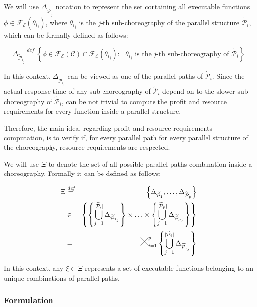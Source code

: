 \documentclass[12pt,a4paper]{report}
\newcommand{\Cross}{\mathbin{\tikz [x=2.5ex,y=2.5ex,line width=.10ex] \draw (0,0) -- (1,1) (0,1) -- (1,0);}}
\newcommand{\mathDef}{\overset{\textit{def}}{=}}
\begin{document}
We will use $\Delta_{\mathcal{\widetilde{P}}_{i_j}}$ notation to represent the set containing all executable functions $\phi \in \mathscr{F_E}(\theta_{i_j})$, where $\theta_{i_j}$ is the $j$-th sub-choreography of the parallel structure $\mathcal{\widetilde{P}}_i$, which can be formally defined as follows:

\begin{equation}
	\Delta_{\mathcal{\widetilde{P}}_{i_j}} \mathDef \left\{ \phi \in \mathscr{F_E}(\mathcal{C}) \cap \mathscr{F_E}(\theta_{i_j}) : \text{  $\theta_{i_j}$ is the $j$-th sub-choreography of } \mathcal{\widetilde{P}}_i \right\} 
\end{equation}

In this context, $\Delta_{\mathcal{\widetilde{P}}_{i_j}}$ can be viewed as one of the parallel paths of $\mathcal{\widetilde{P}}_i$. Since the actual response time of any sub-choreography of $\mathcal{\widetilde{P}}_i$ depend on to the slower sub-choreography of $\mathcal{\widetilde{P}}_i$, can be not trivial to compute the profit and resource requirements for every function inside a parallel structure.  

Therefore, the main idea, regarding profit and resource requirements computation, is to verify if, for every parallel path for every parallel structure of the choreography, resource requirements are respected. 

We will use $\Xi$ to denote the set of all possible parallel paths combination inside a choreography. Formally it can be defined as follows: 

\begin{eqnarray}
	\Xi & \mathDef & \left\lbrace \Delta_{\mathcal{\widetilde{P}}_{1}}, \ldots, \Delta_{\mathcal{\widetilde{P}}_{p}} \right\rbrace \nonumber \\ 
	& \in & \left\{  \left\{ \bigcup_{j=1}^{|\mathcal{\widetilde{P}}_i|} \Delta_{\mathcal{\widetilde{P}}_{1_j}} \right\} \times \ldots \times \left\{ \bigcup_{j=1}^{|\mathcal{\widetilde{P}}_p|} \Delta_{\mathcal{\widetilde{P}}_{p_j}} \right\} \right\}  \nonumber \\
	& = & \Cross_{i = 1}^p  \left\{ \bigcup_{j=1}^{|\mathcal{\widetilde{P}}_i|} \Delta_{\mathcal{\widetilde{P}}_{i_j}} \right\}  \nonumber \\
\end{eqnarray}

In this context, any $\xi \in \Xi$ represents a set of executable functions belonging to an unique combinations of parallel paths.

\subsubsection{Formulation}
\end{document}
